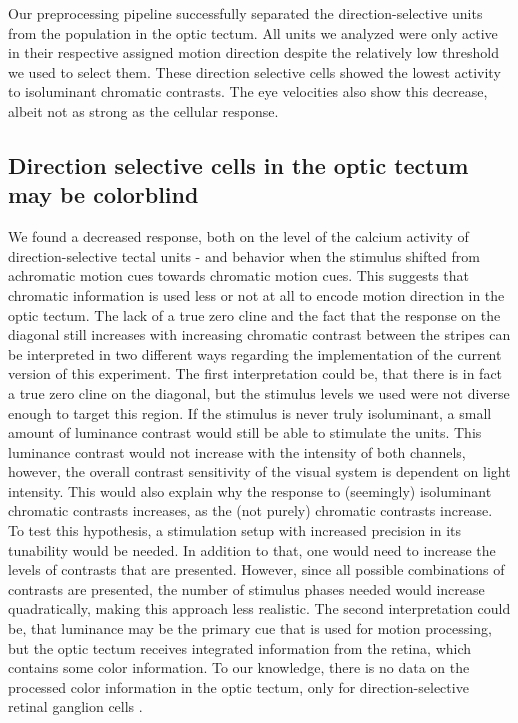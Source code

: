 Our preprocessing pipeline successfully separated the direction-selective units from the population in the optic tectum. All units we analyzed were only active in their respective assigned motion direction despite the relatively low threshold we used to select them. These direction selective cells showed the lowest activity to isoluminant chromatic contrasts. The eye velocities also show this decrease, albeit not as strong as the cellular response.

\subsection{Direction selective cells in the optic tectum may be colorblind}

We found a decreased response, both on the level of the calcium activity of direction-selective tectal units - and behavior when the stimulus shifted from achromatic motion cues towards chromatic motion cues. This suggests that chromatic information is used less or not at all to encode motion direction in the optic tectum. 
The lack of a true zero cline and the fact that the response on the diagonal still increases with increasing chromatic contrast between the stripes can be interpreted in two different ways regarding the implementation of the current version of this experiment. The first interpretation could be, that there is in fact a true zero cline on the diagonal, but the stimulus levels we used were not diverse enough to target this region. If the stimulus is never truly isoluminant, a small amount of luminance contrast would still be able to stimulate the units. This luminance contrast would not increase with the intensity of both channels, however, the overall contrast sensitivity of the visual system is dependent on light intensity. This would also explain why the response to (seemingly) isoluminant chromatic contrasts increases, as the (not purely) chromatic contrasts increase. To test this hypothesis, a stimulation setup with increased precision in its tunability would be needed. In addition to that, one would need to increase the levels of contrasts that are presented. However, since all possible combinations of contrasts are presented, the number of stimulus phases needed would increase quadratically, making this approach less realistic. The second interpretation could be, that luminance may be the primary cue that is used for motion processing, but the optic tectum receives integrated information from the retina, which contains some color information. To our knowledge, there is no data on the processed color information in the optic tectum, only for direction-selective retinal ganglion cells \parencite{wangParallelChannelsMotion2020, ROBLES20142085}. 

